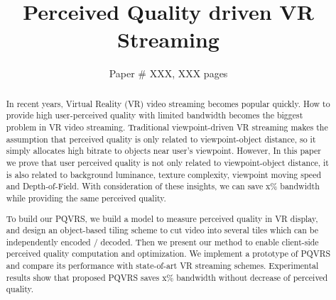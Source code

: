 \documentclass[sigconf]{acmart}
\begin{document}
\title{Perceived Quality driven VR Streaming}


\author{Paper \# XXX, XXX pages}

\renewcommand{\shortauthors}{X.et al.}

\begin{abstract}
In recent years, Virtual Reality (VR) video streaming becomes popular quickly. How to provide high user-perceived quality with limited bandwidth becomes the biggest problem in VR video streaming. Traditional viewpoint-driven VR streaming makes the assumption that perceived quality is only related to viewpoint-object distance, so it simply allocates high bitrate to objects near user's viewpoint. However, In this paper we prove that user perceived quality is not only related to viewpoint-object distance, it is also related to background luminance, texture complexity, viewpoint moving speed and Depth-of-Field. With consideration of these insights, we can save x\% bandwidth while providing the same perceived quality.

To build our PQVRS, we build a model to measure perceived quality in VR display, and design an object-based tiling scheme to cut video into several tiles which can be independently encoded / decoded. Then we present our method to enable client-side perceived quality computation and optimization. We implement a prototype of PQVRS and compare its performance with state-of-art VR streaming schemes. Experimental results show that proposed PQVRS saves x\% bandwidth without decrease of perceived quality.
\end{abstract}

\maketitle














\end{document}
